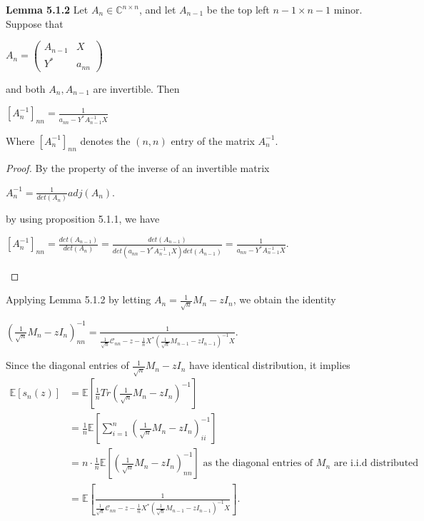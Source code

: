 \documentclass{article}
\begin{document}
\noindent\textbf{Lemma 5.1.2} Let $A_n \in \mathbb{C}^{n\times n}$, and let $A_{n-1}$ be the top left $n-1 \times n-1$ minor. Suppose that
\begin{center}
$A_n = \left(
\begin{array}{cc}
    A_{n-1} &X  \\
    Y^* &a_{nn} 
\end{array}
\right) $    
\end{center}
and both $A_n, A_{n-1}$ are invertible. Then
\begin{center}
    $[A_n^{-1}]_{nn} = \frac{1}{a_{nn} - Y^* A_{n-1}^{-1}X}$
\end{center}
Where $[A_n^{-1}]_{nn}$ denotes the $(n,n)$ entry of the matrix $A_n^{-1}$. 
\begin{proof}
    By the property of the inverse of an invertible matrix
    \begin{center}
        $A_n^{-1} = \frac{1}{det(A_n)} adj(A_n)$.
    \end{center}
    by using proposition 5.1.1, we have
    \begin{center}
        $[A_n^{-1}]_{nn} = \frac{det(A_{n-1})}{det(A_n)} = \frac{det(A_{n-1})}{det(a_{nn} - Y^* A_{n-1}^{-1}X)det(A_{n-1})} = \frac{1}{a_{nn} - Y^* A_{n-1}^{-1}X}.$
    \end{center}  
\end{proof}
\noindent Applying Lemma 5.1.2 by letting $A_n = \frac{1}{\sqrt{n}}M_n-zI_n$, we obtain the identity
\begin{center}
    $\left(\frac{1}{\sqrt{n}} M_n - zI_n\right)_{nn}^{-1} = \frac{1}{\frac{1}{\sqrt{n}} \mathcal{C}_{nn} -z - \frac{1}{n}X^*(\frac{1}{\sqrt{n}}M_{n-1} -zI_{n-1})^{-1}X}.$
\end{center}
Since the diagonal entries of $\frac{1}{\sqrt{n}}M_n-zI_n$ have identical distribution, it implies
    \begin{align*}
        \mathbb{E}[s_n(z)] &= \mathbb{E}\left[\frac{1}{n}Tr\left(\frac{1}{\sqrt{n}}M_n -zI_n\right)^{-1}\right] \\
        &= \frac{1}{n} \mathbb{E}\left[ \sum\limits_{i=1}^n \left(\frac{1}{\sqrt{n}}M_n - zI_n \right)^{-1}_{ii} \right]\\
        &= n\cdot \frac{1}{n}  \mathbb{E}\left[\left(\frac{1}{\sqrt{n}}M_n - zI_n \right)^{-1}_{nn} \right] \text{ as the diagonal entries of }M_n \text{ are i.i.d distributed}\\
        &= \mathbb{E}\left[\frac{1}{\frac{1}{\sqrt{n}} \mathcal{C}_{nn} -z - \frac{1}{n}X^*(\frac{1}{\sqrt{n}}M_{n-1} -zI_{n-1})^{-1}X}\right].
    \end{align*}
\end{document}
